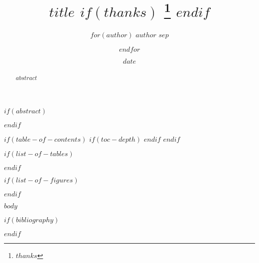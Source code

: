 \documentclass[
  $if(papersize)$
    $papersize$paper,
  $endif$
  $if(fontsize)$
    $fontsize$,
  $endif$
  $if(twocolumn)$
    twocolumn,
  $endif$
  $if(oneside)$
    oneside,
  $endif$
  $if(titlepage)$
    titlepage,
  $endif$
  $if(draft)$
    draft,
  $endif$
]{$document-type$}
\title{
    $title$
    $if(thanks)$
      \thanks{$thanks$}
    $endif$
  }
\author{
    $for(author)$
      $author$
      $sep$ \and 
    $endfor$
  }
\date{$date$}
\begin{document}
\maketitle

$if(abstract)$
  \begin{abstract}
    $abstract$
  \end{abstract}
$endif$

$if(table-of-contents)$
  $if(toc-depth)$
    \setcounter{tocdepth}{$toc-depth$}
  $endif$
  \tableofcontents
$endif$

$if(list-of-tables)$
  \listoftables
$endif$

$if(list-of-figures)$
  \listoffigures
$endif$

$body$

$if(bibliography)$
  \newpage
  
$endif$
\end{document}
